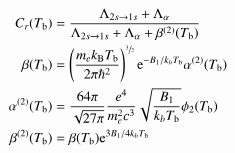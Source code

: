 \begin{subequations}
    \begin{align}
        C_r(T_\mathrm{b}) &= \frac{\Lambda_{2s\to 1s}+ \Lambda_{\alpha}}{\Lambda_{2s\to 1s} + \Lambda_\alpha + \beta^{(2)}(T_\mathrm{b})} \\
        \beta (T_\mathrm{b}) &= \left(\frac{m_e k_\mathrm{B}T_\mathrm{b}}{2\pi \hbar^2} \right)^{\sfrac{3}{2}} \mathrm{e}^{-B_1/k_b T_\mathrm{b}} \alpha^{(2)}(T_\mathrm{b}) \\
        \alpha^{(2)}(T_\mathrm{b}) &= \frac{64 \pi}{\sqrt{27\pi}} \frac{e^4}{m_e^2c^3} \sqrt{\frac{B_1}{k_b T_\mathrm{b}}} \phi_2(T_\mathrm{b}) \\
        \beta^{(2)}(T_\mathrm{b}) &= \beta(T_\mathrm{b})\mathrm{e}^{3B_1 /4k_b T_\mathrm{b}}
    \end{align}
\end{subequations}